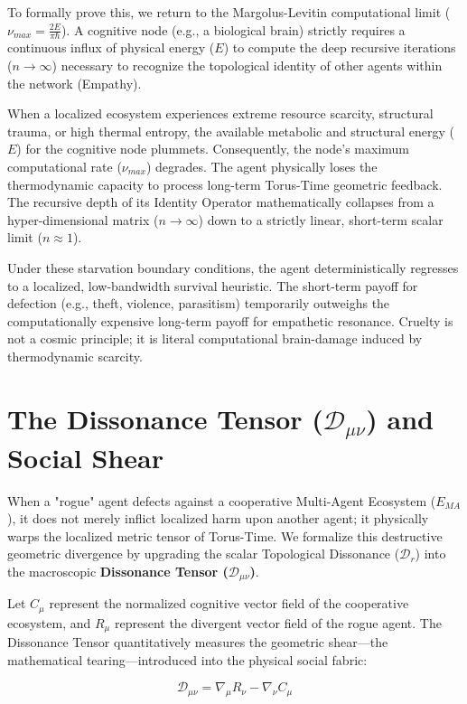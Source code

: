 \documentclass[12pt,openany]{book}
\begin{document}
To formally prove this, we return to the Margolus-Levitin computational limit ($\nu_{max} = \frac{2E}{\pi \hbar}$). A cognitive node (e.g., a biological brain) strictly requires a continuous influx of physical energy ($E$) to compute the deep recursive iterations ($n \to \infty$) necessary to recognize the topological identity of other agents within the network (Empathy). 

When a localized ecosystem experiences extreme resource scarcity, structural trauma, or high thermal entropy, the available metabolic and structural energy ($E$) for the cognitive node plummets. Consequently, the node's maximum computational rate ($\nu_{max}$) degrades. The agent physically loses the thermodynamic capacity to process long-term Torus-Time geometric feedback. The recursive depth of its Identity Operator mathematically collapses from a hyper-dimensional matrix ($n \to \infty$) down to a strictly linear, short-term scalar limit ($n \approx 1$). 

Under these starvation boundary conditions, the agent deterministically regresses to a localized, low-bandwidth survival heuristic. The short-term payoff for defection (e.g., theft, violence, parasitism) temporarily outweighs the computationally expensive long-term payoff for empathetic resonance. Cruelty is not a cosmic principle; it is literal computational brain-damage induced by thermodynamic scarcity.

\section{The Dissonance Tensor ($\mathcal{D}_{\mu\nu}$) and Social Shear}
When a "rogue" agent defects against a cooperative Multi-Agent Ecosystem ($E_{MA}$), it does not merely inflict localized harm upon another agent; it physically warps the localized metric tensor of Torus-Time. We formalize this destructive geometric divergence by upgrading the scalar Topological Dissonance ($\mathcal{D}_r$) into the macroscopic \textbf{Dissonance Tensor ($\mathcal{D}_{\mu\nu}$)}.

Let $C_\mu$ represent the normalized cognitive vector field of the cooperative ecosystem, and $R_\mu$ represent the divergent vector field of the rogue agent. The Dissonance Tensor quantitatively measures the geometric shear---the mathematical tearing---introduced into the physical social fabric:

\begin{equation}
\mathcal{D}_{\mu\nu} = \nabla_\mu R_\nu - \nabla_\nu C_\mu
\end{equation}
\end{document}
